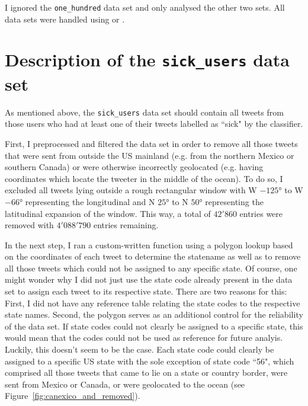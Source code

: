 \documentclass[11pt, a4paper,twoside]{report}\usepackage[]{graphicx}\usepackage[]{color}
\begin{document}
I ignored the \texttt{one\_hundred} data set and only analysed the other two sets. All data sets were handled using  or .

\section{Description of the \texttt{sick\_users} data set}
\label{sec:sick_user_exploratory}


As mentioned above, the \texttt{sick\_users} data set should contain all tweets from those users who had at least one of their tweets labelled as ``sick" by the classifier.

First, I preprocessed and filtered the data set in order to remove all those tweets that were sent from outside the US mainland (e.g. from the northern Mexico or southern Canada) or were otherwise incorrectly geolocated (e.g. having coordinates which locate the tweeter in the middle of the ocean). To do so, I excluded all tweets lying outside a rough rectangular window with W $-125$° to W $-66$° representing the longitudinal and N $25$° to N $50$° representing the latitudinal expansion of the window. This way, a total of $42'860$ entries were removed with $4'088'790$ entries remaining.

In the next step, I ran a custom-written function using a polygon lookup based on the coordinates of each tweet to determine the statename as well as to remove all those tweets which could not be assigned to any specific state. Of course, one might wonder why I did not just use the state code already present in the data set to assign each tweet to its respective state. There are two reasons for this: First, I did not have any reference table relating the state codes to the respective state names. Second, the polygon serves as an additionol control for the reliability of the data set. If state codes could not clearly be assigned to a specific state, this would mean that the codes could not be used as reference for future analyis. Luckily, this doesn't seem to be the case. Each state code could clearly be assigned to a specific US state with the sole exception of state code ``56", which comprised all those tweets that came to lie on a state or country border, were sent from Mexico or Canada, or were geolocated to the ocean (see Figure~\ref{fig:canexico_and_removed}).
\end{document}
